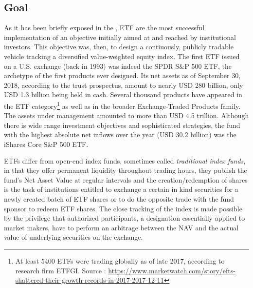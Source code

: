 \subsection{Goal}
As it has been briefly exposed in the , ETF are the most successful implementation of an objective initially aimed at and reached by institutional investors. This objective was, then, to design a contiuously, publicly tradable vehicle tracking a diversified value-weighted equity index. The first ETF issued on a U.S. exchange (back in 1993)  was indeed the SPDR S\&P 500 ETF, the archetype of the first products ever designed. Its net assets as of September 30, 2018, according to the trust prospectus, amount to nearly USD 280 billion, only USD 1.3 billion being held in cash. Several thousand products have appeared in the ETF category\footnote{At least 5400 ETFs were trading globally as of late 2017, according to research firm ETFGI. Source : \url{https://www.marketwatch.com/story/efts-shattered-their-growth-records-in-2017-2017-12-11}} as well as in the broader Exchange-Traded Products family. The assets under management amounted to more than USD 4.5 trillion. Although there is wide range investment objectives and sophisticated strategies, the fund with the highest absolute net inflows over the year (USD 30.2 billion) was the iShares Core S\&P 500 ETF.


ETFs differ from open-end index funds, sometimes called \textit{traditional index funds}, in that they offer permanent liquidity throughout trading hours, they publish the fund's Net Asset Value at regular intervals and the creation/redemption of shares is the task of institutions entitled to exchange a certain in kind securities for a newly created batch of ETF shares or to do the opposite trade with the fund sponsor to redeem ETF shares. The close tracking of the index is made possible by the privilege that authorized participants, a designation essentially applied to market makers, have to perform an arbitrage between the NAV and the actual value of underlying securities on the exchange. \parencite{Ben-David2017}

